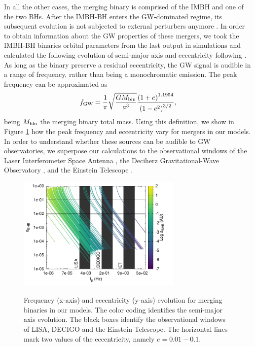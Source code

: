 \documentclass[twocolumn]{aastex62}
\newcommand{\gw}{{\rm GW}}
\begin{document}
In all the other cases, the merging binary is comprised of the IMBH and one of the two BHs. After the IMBH-BH enters the GW-dominated regime, its subsequent evolution is not subjected to external perturbers anymore \citep{seoane18}. In order to obtain information about the GW properties of these mergers, we took the IMBH-BH binaries orbital parameters from the last output in simulations and calculated the following evolution of semi-major axis and eccentricity following \cite{peters64}. As long as the binary preserve a residual eccentricity, the GW signal is audible in a range of frequency, rather than being a monochromatic emission. The peak frequency can be approximated as \citep{wen03, antonini12}
\begin{equation}
f_\gw = \frac{1}{\pi}\sqrt{\frac{GM_{\rm bin}}{a^3}}\frac{\left(1+e\right)^{1.1954}}{\left(1-e^2\right)^{3/2}},
\end{equation}  
being $M_{\rm bin}$ the merging binary total mass. Using this definition, we show in Figure \ref{F10} how the peak frequency and eccentricity vary for mergers in our models. In order to understand whether these sources can be audible to GW observatories, we superpose our calculations to the observational windows of the Laser Interferometer Space Antenna \citep[LISA\footnote{\url{https://www.elisascience.org/}},][]{amaro12}, the Deciherz Gravitational-Wave Observatory \citep[DECIGO\footnote{\url{http://tamago.mtk.nao.ac.jp/spacetime/decigo_e.html}},][]{seto01}, and the Einstein Telescope \citep[ET\footnote{\url{http://www.et-gw.eu/}},][]{punturo10}. 

\begin{figure}
\centering
\includegraphics[width=8cm]{freq_evo}\\
\caption{Frequency (x-axis) and eccentricity (y-axis) evolution for merging binaries in our models. The color coding identifies the semi-major axis evolution. The black boxes identify the observational windows of LISA, DECIGO and the Einstein Telescope. The horizontal lines mark two values of the eccentricity, namely $e=0.01-0.1$.}
\label{F10}
\end{figure}
\end{document}
